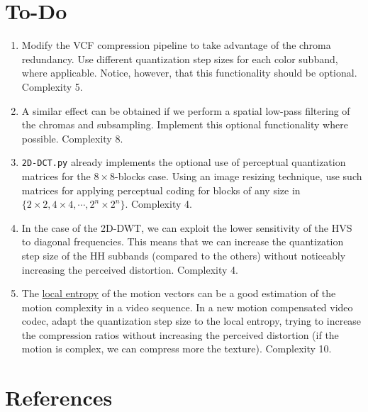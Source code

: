 \section{To-Do}
\begin{enumerate}
\item Modify the VCF compression pipeline to take advantage of the
  chroma redundancy. Use different quantization step sizes for each
  color subband, where applicable. Notice, however, that this
  functionality should be optional. Complexity 5.
\item A similar effect can be obtained if we perform a spatial
  low-pass filtering of the chromas and subsampling. Implement this
  optional functionality where possible. Complexity 8.
\item \texttt{2D-DCT.py} already implements the optional use of
  perceptual quantization matrices for the $8\times 8$-blocks
  case. Using an image resizing technique, use such matrices for
  applying perceptual coding for blocks of any size in
  $\{2\times 2, 4\times 4, \cdots, 2^n\times 2^n\}$. Complexity 4.
\item In the case of the 2D-DWT, we can exploit the lower sensitivity
  of the HVS to diagonal frequencies. This means that we can increase
  the quantization step size of the HH subbands (compared to the
  others) without noticeably increasing the perceived
  distortion. Complexity 4.
\item The
  \href{https://scikit-image.org/docs/stable/auto_examples/filters/plot_entropy.html}{local
    entropy} of the motion vectors can be a good estimation of the
  motion complexity in a video sequence. In a new motion compensated
  video codec, adapt the quantization step size to the local entropy,
  trying to increase the compression ratios without increasing the
  perceived distortion (if the motion is complex, we can compress more
  the texture). Complexity 10.
\end{enumerate}

\section{References}

\renewcommand{\addcontentsline}[3]{}%

